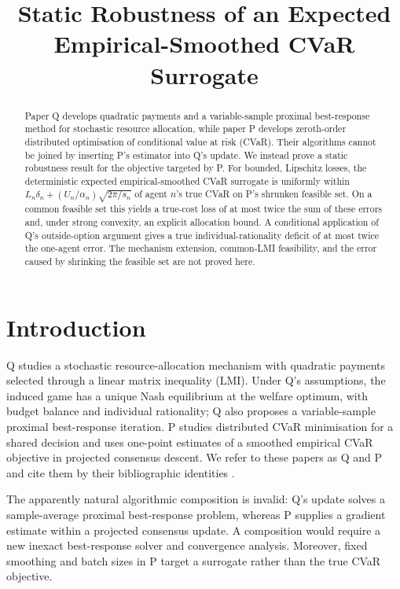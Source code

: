 \documentclass{article}
\title{Static Robustness of an Expected Empirical-Smoothed CVaR Surrogate}
\author{}
\date{}
\begin{document}
\maketitle

\begin{abstract}
Paper Q develops quadratic payments and a variable-sample proximal best-response method for stochastic resource allocation, while paper P develops zeroth-order distributed optimisation of conditional value at risk (CVaR).  %
Their algorithms cannot be joined by inserting P's estimator into Q's update.  %
We instead prove a static robustness result for the objective targeted by P.  For bounded, Lipschitz losses, the deterministic expected empirical-smoothed CVaR surrogate is uniformly within
$L_n\delta_n+(U_n/\alpha_n)\sqrt{2\pi/s_n}$ of agent $n$'s true CVaR on P's shrunken feasible set.  %
On a common feasible set this yields a true-cost loss of at most twice the sum of these errors and, under strong convexity, an explicit allocation bound.  %
A conditional application of Q's outside-option argument gives a true individual-rationality deficit of at most twice the one-agent error.  %
The mechanism extension, common-LMI feasibility, and the error caused by shrinking the feasible set are not proved here.  %
\end{abstract}

\section{Introduction}

Q studies a stochastic resource-allocation mechanism with quadratic payments selected through a linear matrix inequality (LMI).  Under Q's assumptions, the induced game has a unique Nash equilibrium at the welfare optimum, with budget balance and individual rationality; Q also proposes a variable-sample proximal best-response iteration.  %
P studies distributed CVaR minimisation for a shared decision and uses one-point estimates of a smoothed empirical CVaR objective in projected consensus descent.  %
We refer to these papers as Q and P and cite them by their bibliographic identities \cite{Q,P}.

The apparently natural algorithmic composition is invalid: Q's update solves a sample-average proximal best-response problem, whereas P supplies a gradient estimate within a projected consensus update.  %
A composition would require a new inexact best-response solver and convergence analysis.  %
Moreover, fixed smoothing and batch sizes in P target a surrogate rather than the true CVaR objective.  %
\end{document}
